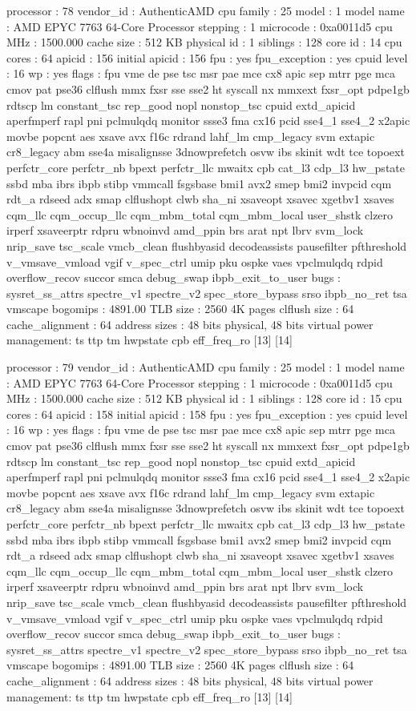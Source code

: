 processor	: 78
vendor_id	: AuthenticAMD
cpu family	: 25
model		: 1
model name	: AMD EPYC 7763 64-Core Processor
stepping	: 1
microcode	: 0xa0011d5
cpu MHz		: 1500.000
cache size	: 512 KB
physical id	: 1
siblings	: 128
core id		: 14
cpu cores	: 64
apicid		: 156
initial apicid	: 156
fpu		: yes
fpu_exception	: yes
cpuid level	: 16
wp		: yes
flags		: fpu vme de pse tsc msr pae mce cx8 apic sep mtrr pge mca cmov pat pse36 clflush mmx fxsr sse sse2 ht syscall nx mmxext fxsr_opt pdpe1gb rdtscp lm constant_tsc rep_good nopl nonstop_tsc cpuid extd_apicid aperfmperf rapl pni pclmulqdq monitor ssse3 fma cx16 pcid sse4_1 sse4_2 x2apic movbe popcnt aes xsave avx f16c rdrand lahf_lm cmp_legacy svm extapic cr8_legacy abm sse4a misalignsse 3dnowprefetch osvw ibs skinit wdt tce topoext perfctr_core perfctr_nb bpext perfctr_llc mwaitx cpb cat_l3 cdp_l3 hw_pstate ssbd mba ibrs ibpb stibp vmmcall fsgsbase bmi1 avx2 smep bmi2 invpcid cqm rdt_a rdseed adx smap clflushopt clwb sha_ni xsaveopt xsavec xgetbv1 xsaves cqm_llc cqm_occup_llc cqm_mbm_total cqm_mbm_local user_shstk clzero irperf xsaveerptr rdpru wbnoinvd amd_ppin brs arat npt lbrv svm_lock nrip_save tsc_scale vmcb_clean flushbyasid decodeassists pausefilter pfthreshold v_vmsave_vmload vgif v_spec_ctrl umip pku ospke vaes vpclmulqdq rdpid overflow_recov succor smca debug_swap ibpb_exit_to_user
bugs		: sysret_ss_attrs spectre_v1 spectre_v2 spec_store_bypass srso ibpb_no_ret tsa vmscape
bogomips	: 4891.00
TLB size	: 2560 4K pages
clflush size	: 64
cache_alignment	: 64
address sizes	: 48 bits physical, 48 bits virtual
power management: ts ttp tm hwpstate cpb eff_freq_ro [13] [14]

processor	: 79
vendor_id	: AuthenticAMD
cpu family	: 25
model		: 1
model name	: AMD EPYC 7763 64-Core Processor
stepping	: 1
microcode	: 0xa0011d5
cpu MHz		: 1500.000
cache size	: 512 KB
physical id	: 1
siblings	: 128
core id		: 15
cpu cores	: 64
apicid		: 158
initial apicid	: 158
fpu		: yes
fpu_exception	: yes
cpuid level	: 16
wp		: yes
flags		: fpu vme de pse tsc msr pae mce cx8 apic sep mtrr pge mca cmov pat pse36 clflush mmx fxsr sse sse2 ht syscall nx mmxext fxsr_opt pdpe1gb rdtscp lm constant_tsc rep_good nopl nonstop_tsc cpuid extd_apicid aperfmperf rapl pni pclmulqdq monitor ssse3 fma cx16 pcid sse4_1 sse4_2 x2apic movbe popcnt aes xsave avx f16c rdrand lahf_lm cmp_legacy svm extapic cr8_legacy abm sse4a misalignsse 3dnowprefetch osvw ibs skinit wdt tce topoext perfctr_core perfctr_nb bpext perfctr_llc mwaitx cpb cat_l3 cdp_l3 hw_pstate ssbd mba ibrs ibpb stibp vmmcall fsgsbase bmi1 avx2 smep bmi2 invpcid cqm rdt_a rdseed adx smap clflushopt clwb sha_ni xsaveopt xsavec xgetbv1 xsaves cqm_llc cqm_occup_llc cqm_mbm_total cqm_mbm_local user_shstk clzero irperf xsaveerptr rdpru wbnoinvd amd_ppin brs arat npt lbrv svm_lock nrip_save tsc_scale vmcb_clean flushbyasid decodeassists pausefilter pfthreshold v_vmsave_vmload vgif v_spec_ctrl umip pku ospke vaes vpclmulqdq rdpid overflow_recov succor smca debug_swap ibpb_exit_to_user
bugs		: sysret_ss_attrs spectre_v1 spectre_v2 spec_store_bypass srso ibpb_no_ret tsa vmscape
bogomips	: 4891.00
TLB size	: 2560 4K pages
clflush size	: 64
cache_alignment	: 64
address sizes	: 48 bits physical, 48 bits virtual
power management: ts ttp tm hwpstate cpb eff_freq_ro [13] [14]

